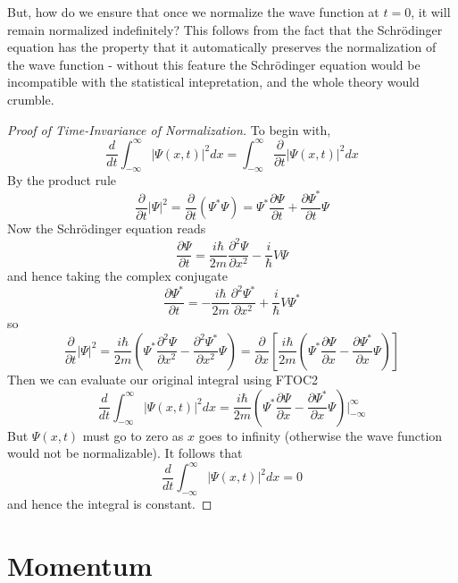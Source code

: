 \documentclass[12pt, a4paper, oneside, openright, titlepage]{book}
\begin{document}
But, how do we ensure that once we normalize the wave function at $t = 0$, it will remain normalized indefinitely? This follows from the fact that the Schr\"{o}dinger equation has the property that it automatically preserves the normalization of the wave function - without this feature the Schr\"{o}dinger equation would be incompatible with the statistical intepretation, and the whole theory would crumble.

\begin{proof}[Proof of Time-Invariance of Normalization]
    To begin with, $$\frac{d}{dt}\int_{-\infty}^{\infty}|\Psi(x,t)|^2dx = \int_{-\infty}^{\infty}\frac{\partial}{\partial t}|\Psi(x,t)|^2dx$$ By the product rule $$\frac{\partial }{\partial t}|\Psi|^2 = \frac{\partial}{\partial t}(\Psi^*\Psi) = \Psi^*\frac{\partial\Psi}{\partial t}+\frac{\partial \Psi^*}{\partial t}\Psi$$ Now the Schr\"{o}dinger equation reads $$\frac{\partial \Psi}{\partial t} = \frac{i\hbar}{2m}\frac{\partial^2\Psi}{\partial x^2} - \frac{i}{\hbar}V\Psi$$ and hence taking the complex conjugate $$\frac{\partial \Psi^*}{\partial t} = -\frac{i\hbar}{2m}\frac{\partial^2\Psi^*}{\partial x^2} + \frac{i}{\hbar}V\Psi^*$$ so $$\frac{\partial}{\partial t}|\Psi|^2 = \frac{i\hbar}{2m}\left(\Psi^*\frac{\partial^2\Psi}{\partial x^2} - \frac{\partial^2\Psi^*}{\partial x^2}\Psi\right) = \frac{\partial}{\partial x}\left[\frac{i\hbar}{2m}\left(\Psi^*\frac{\partial \Psi}{\partial x} - \frac{\partial \Psi^*}{\partial x}\Psi\right)\right]$$
    Then we can evaluate our original integral using FTOC2 \begin{equation*}
        \frac{d}{dt}\int_{-\infty}^{\infty}|\Psi(x,t)|^2dx = \frac{i\hbar}{2m}\left(\Psi^*\frac{\partial \Psi}{\partial x} - \frac{\partial \Psi^*}{\partial x}\Psi\right)\Big\rvert_{-\infty}^{\infty}
    \end{equation*}
    But $\Psi(x,t)$ must go to zero as $x$ goes to infinity (otherwise the wave function would not be normalizable). It follows that $$\frac{d}{dt}\int_{-\infty}^{\infty}|\Psi(x,t)|^2dx = 0$$
    and hence the integral is constant.
\end{proof}


\section{Momentum}
\end{document}
